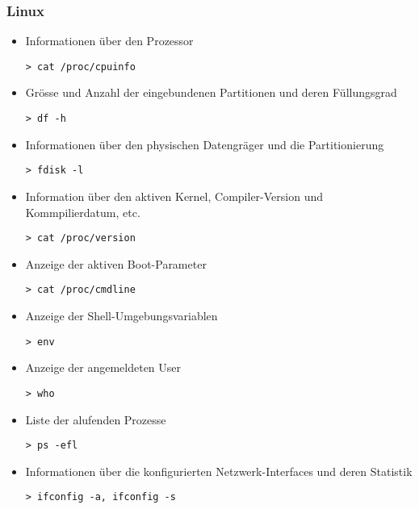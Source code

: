 \subsubsection{Linux}
\begin{itemize}
\item Informationen über den Prozessor 
\begin{lstlisting}
> cat /proc/cpuinfo
\end{lstlisting}

\item Grösse und Anzahl der eingebundenen Partitionen und deren Füllungsgrad 
\begin{lstlisting}
> df -h
\end{lstlisting}

\item  Informationen über den physischen Datengräger und die Partitionierung
\begin{lstlisting}
> fdisk -l
\end{lstlisting}

\item  Information über den aktiven Kernel, Compiler-Version und Kommpilierdatum, etc.
\begin{lstlisting}
> cat /proc/version
\end{lstlisting}

\item  Anzeige der aktiven Boot-Parameter
\begin{lstlisting}
> cat /proc/cmdline
\end{lstlisting}


\item  Anzeige der Shell-Umgebungsvariablen
\begin{lstlisting}
> env
\end{lstlisting}

\item  Anzeige der angemeldeten User
\begin{lstlisting}
> who
\end{lstlisting}

\item  Liste der alufenden Prozesse
\begin{lstlisting}
> ps -efl
\end{lstlisting}

\item  Informationen über die konfigurierten Netzwerk-Interfaces und deren Statistik 
\begin{lstlisting}
> ifconfig -a, ifconfig -s
\end{lstlisting}


\end{itemize}
